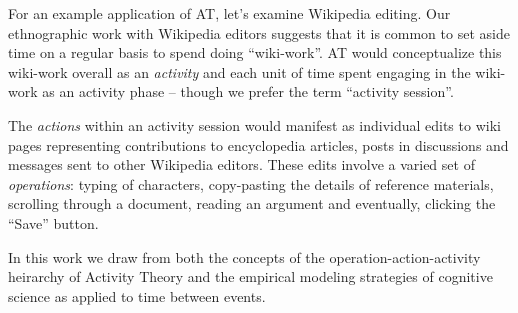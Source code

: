 For an example application of AT, let's examine Wikipedia editing.  Our ethnographic work with Wikipedia editors suggests that it is common to set aside time on a regular basis to spend doing ``wiki-work''.  AT would conceptualize this wiki-work overall as an \emph{activity} and each unit of time spent engaging in the wiki-work as an activity phase -- though we prefer the term ``activity session''.

The \emph{actions} within an activity session would manifest as individual edits to wiki pages representing contributions to encyclopedia articles, posts in discussions and messages sent to other Wikipedia editors.  These edits involve a varied set of \emph{operations}: typing of characters, copy-pasting the details of reference materials, scrolling through a document, reading an argument and eventually, clicking the ``Save'' button.

In this work we draw from both the concepts of the operation-action-activity heirarchy of Activity Theory and the empirical modeling strategies of cognitive science as applied to time between events.
